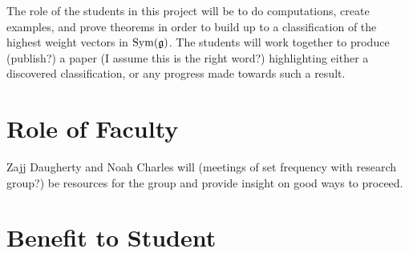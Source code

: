 The role of the students in this project will be to do computations, create examples, and prove theorems in order to build up to a classification of the highest weight vectors in $\operatorname{Sym}(\mathfrak{g})$. The students will work together to produce (publish?) a paper (I assume this is the right word?) highlighting either a discovered classification, or any progress made towards such a result.

\section{Role of Faculty}

Zajj Daugherty and Noah Charles will (meetings of set frequency with research group?) be resources for the group and provide insight on good ways to proceed. %

\section{Benefit to Student}


\printbibliography{}


